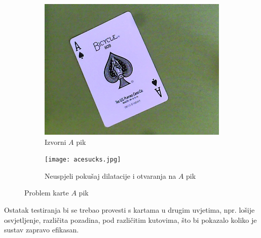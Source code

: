\documentclass[times, zavrsni, numeric, utf8]{fer}
\begin{document}
\begin{figure}[H]
\begin{subfigure}{.5\textwidth}
  \centering
  \includegraphics[width=0.8\linewidth]{sve-karte/img0.jpg}
  \caption{Izvorni $A$ pik}
  \label{fig:asource}
\end{subfigure}%
\begin{subfigure}{.5\textwidth}
  \centering
  \texttt{[image: acesucks.jpg]}
  \caption{Neuspjeli pokušaj dilatacije i otvaranja na $A$ pik}
  \label{fig:openedace}
\end{subfigure}
\caption{Problem karte $A$ pik}
\label{fig:aceproblem}
\end{figure}

Ostatak testiranja bi se trebao provesti s kartama u drugim uvjetima, npr. lošije osvjetljenje, različita pozadina, pod različitim kutovima, što bi pokazalo koliko je sustav zapravo efikasan. 
\end{document}
